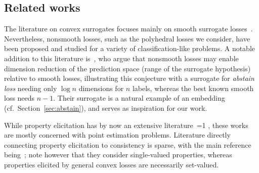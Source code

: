 \documentclass[12pt]{article}
\newcommand{\Comments}{1}
\newcommand{\mynote}[2]{\ifnum\Comments=1\textcolor{#1}{#2}\fi}
\newcommand{\mytodo}[2]{\ifnum\Comments=1%
  \todo[linecolor=#1!80!black,backgroundcolor=#1,bordercolor=#1!80!black]{#2}\fi}
\newcommand{\raft}[1]{\mytodo{green!20!white}{RF: #1}}
\newcommand{\jessie}[1]{\mynote{purple}{[JF: #1]}}
\newcommand{\jessiet}[1]{\mytodo{purple!20!white}{JF: #1}}
\begin{document}

\subsection{Related works}

The literature on convex surrogates focuses mainly on smooth surrogate losses~\cite{crammer2001algorithmic,bartlett2006convexity,bartlett2008classification, duchi2018multiclass, williamson2016composite, reid2010composite}.
Nevertheless, nonsmooth losses, such as the polyhedral losses we consider, have been proposed and studied for a variety of classification-like problems\cite{yang2018consistency,yu2018lovasz,lapin2015top}.
A notable addition to this literature is~\citet{ramaswamy2018consistent}, who argue that nonsmooth losses may enable dimension reduction of the prediction space (range of the surrogate hypothesis) relative to smooth losses, illustrating this conjecture with a surrogate for \emph{abstain loss} needing only $\log n$ dimensions for $n$ labels, whereas the best known smooth loss needs $n-1$.
Their surrogate is a natural example of an embedding (cf.~Section~\ref{sec:abstain}), and serves as inspiration for our work.

While property elicitation has by now an extensive literature~\cite{savage1971elicitation,osband1985information-eliciting,lambert2008eliciting,gneiting2011making,steinwart2014elicitation,frongillo2015vector-valued,fissler2016higher,lambert2018elicitation}\raft{others? already a bit much...}, these works are mostly concerned with point estimation problems.
Literature directly connecting property elicitation to consistency is sparse, with the main reference being~\citet{agarwal2015consistent}; note however that they consider single-valued properties, whereas properties elicited by general convex losses are necessarily set-valued.
\end{document}

